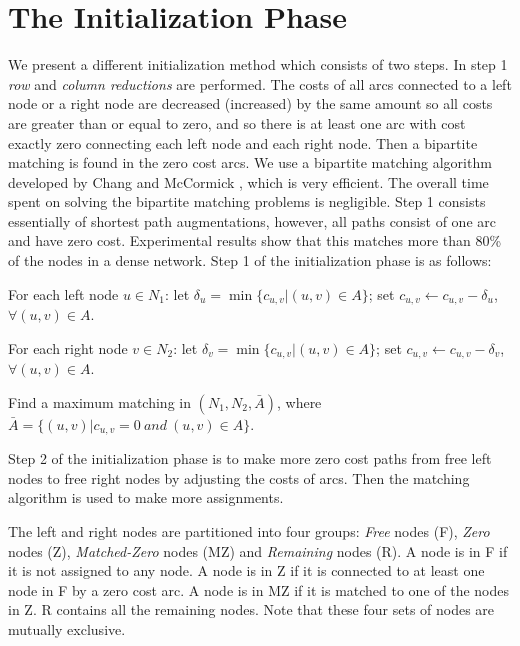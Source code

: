 \section{ The Initialization Phase}

We present a different initialization method
which consists of two steps.
In step 1 {\it row} and {\it column reductions} are performed.
The costs of all arcs connected
to a left node or a right node are decreased (increased) by the same
amount so all costs are greater than or equal to
zero, and so there is at least one arc with cost exactly zero
 connecting each left node and each right node. 
Then a bipartite matching is found in the zero cost arcs. We use
a bipartite matching algorithm developed by Chang and McCormick
\cite{jon1}, which is very efficient. 
The overall time spent on solving the bipartite matching
problems is negligible.
Step 1 consists essentially of shortest path
augmentations, however, all paths consist of one arc and
have zero cost.
Experimental results show that this matches more than 
80\% of the nodes in a dense network. 
Step 1 of the initialization phase is as follows:


\begin{enumerate}
{\small\it
\item For each left node $u\in N_1$: 
let $\delta_u
=\min \{ c_{u,v}|(u,v)\in A\}$; set $c_{u,v} \leftarrow c_{u,v} - \delta_u$,
$\forall (u,v)\in A$.

\item For each right node $v\in N_2$: 
let $\delta_v
=\min \{ c_{u,v}|(u,v)\in A\}$; set $c_{u,v} \leftarrow c_{u,v} - \delta_v$,
$\forall (u,v)\in A$.

\item Find a maximum matching in $(N_1,N_2,\bar A)$, where
$\bar A =\{(u,v)|c_{u,v} = 0\ and\ (u,v)\in A\}$.
}
\end{enumerate}
\vskip 5pt

Step 2 of the initialization phase is to make more zero cost
paths from free left nodes to free right nodes by adjusting the costs
of arcs. Then the matching algorithm is used to make more assignments.

The left and right nodes are partitioned into four groups: {\it Free}
nodes (F), {\it Zero} nodes (Z), {\it Matched-Zero} nodes (MZ) and
{\it Remaining} nodes (R).  A node is in F if it is not assigned to
any node. A node is in Z if it is connected to at least one node in F
by a zero cost arc. A node is in MZ if it is matched to one of the
nodes in Z. R contains all the remaining nodes.  Note that these four
sets of nodes are mutually exclusive.


